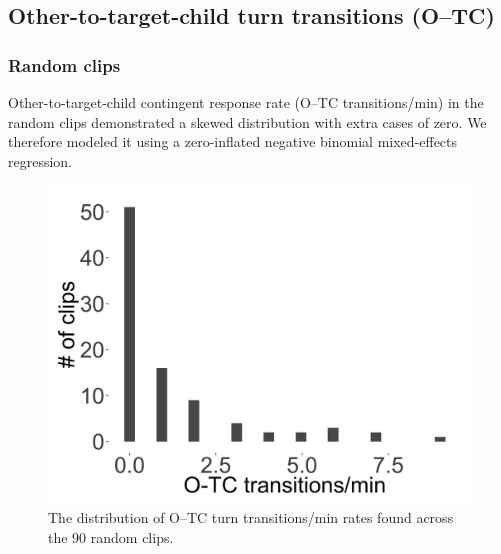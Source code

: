 \documentclass[floatsintext,man]{apa6}
\theoremstyle{definition}
\theoremstyle{definition}
\theoremstyle{definition}
\theoremstyle{remark}
\begin{document}
\FloatBarrier

\subsection{Other-to-target-child turn transitions
(O--TC)}\label{models-o_tc}

\subsubsection{Random clips}\label{models-o_tc-random}

Other-to-target-child contingent response rate (O--TC transitions/min)
in the random clips demonstrated a skewed distribution with extra cases
of zero. We therefore modeled it using a zero-inflated negative binomial
mixed-effects regression.

\FloatBarrier

\begin{figure}[H]

{\centering \includegraphics[width=0.4\linewidth]{www/o_c_tpm_random_distribution} 

}

\caption{The distribution of O--TC turn transitions/min rates found across the 90 random clips.}\label{fig:fig19}
\end{figure}

\FloatBarrier
\end{document}
